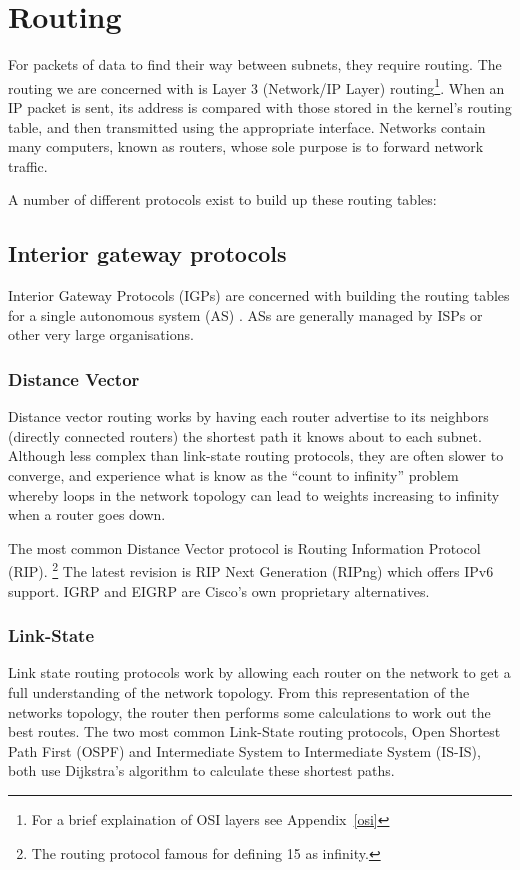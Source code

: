 \documentclass[12pt,a4paper,twoside]{report}
\begin{document}
\section{Routing}
For packets of data to find their way between subnets, they require routing.
The routing we are concerned with is Layer 3 (Network/IP Layer)
routing\footnote{For a brief explaination of OSI layers see
Appendix~\ref{osi}}. When an IP packet is sent, its address is compared with
those stored in the kernel's routing table, and then transmitted using the
appropriate interface. Networks contain many computers, known as routers, whose
sole purpose is to forward network traffic.

A number of different protocols exist to build up these routing tables:

\subsection{Interior gateway protocols}
Interior Gateway Protocols (IGPs)  are concerned with building the routing tables for a single
autonomous system (AS) . ASs are generally
managed by ISPs or other very large organisations.  

\subsubsection{Distance Vector}
Distance vector routing works by having each router advertise to its neighbors
(directly connected routers) the shortest path it knows about to each subnet.
Although less complex than link-state routing protocols, they are often slower
to converge, and experience what is know as the ``count to infinity'' problem
whereby loops in the network topology can lead to weights increasing to
infinity when a router goes down. 

The most common Distance Vector protocol is Routing Information Protocol (RIP).
 \footnote{The routing protocol
famous for defining 15 as infinity.} The latest revision is RIP Next Generation
(RIPng) which offers IPv6 support. IGRP and EIGRP are Cisco's own proprietary
alternatives.

\subsubsection{Link-State}
Link state routing protocols work by allowing each router on the network to get
a full understanding of the network topology. From this representation of the
networks topology, the router then performs some calculations to work out the
best routes. The two most common Link-State routing protocols, Open Shortest
Path First (OSPF)  and
Intermediate System to Intermediate System (IS-IS),
 both use
Dijkstra's algorithm to calculate these shortest paths. 
\end{document}
